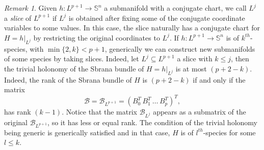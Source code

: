 \documentclass{article}
\theoremstyle{remark}
\newtheorem{remark}[thm]{Remark}
\begin{document}
\begin{remark}
    Given $h:L^{p+1}\rightarrow\mathbb{S}^n$ a submanifold with a conjugate chart, we call $L^j$ a {\it slice} of $L^{p+1}$ if $L^j$ is obtained after fixing some of the conjugate coordinate variables to some values. 
    In this case, the slice naturally has a conjugate chart for $H=h|_{L^j}$ by restricting the original coordinates to $L^j$.
    If $h:L^{p+1}\rightarrow\mathbb{S}^{n}$ is of $k^{th}$-species, with $\min\{2,k\}<p+1$, generically we can construct new submanifolds of some species by taking slices. Indeed, let $L^j\subseteq L^{p+1}$ a slice with $k\leq j$, then the trivial holonomy of the Sbrana bundle of $H=h|_{L^j}$ is at most $(p+2-k)$. Indeed, the rank of the Sbrana bundle of $H$ is $(p+2-k)$ if and only if the matrix
\begin{equation*}\label{mathcal B}
    \mathcal{B}=\mathcal{B}_{L^{p+1}}=(B_0^T\, B_1^T\,\ldots\, B_p^T)^T,
\end{equation*}
has rank $(k-1)$. Notice that the matrix $\mathcal{B}_{L^j}$ appears as a submatrix of the original $\mathcal{B}_{L^{p+1}}$, so it has less or equal rank. The condition of the trivial holonomy being generic is generically satisfied and in that case, $H$ is of $l^{th}$-species for some $l\leq k$.
\end{remark}
\end{document}
